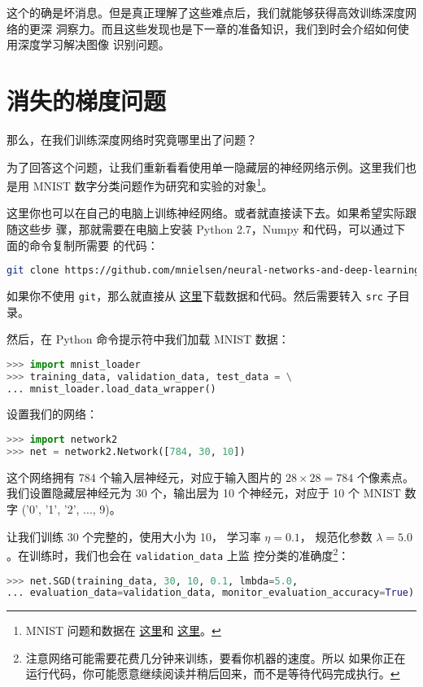 这个的确是坏消息。但是真正理解了这些难点后，我们就能够获得高效训练深度网络的更深
洞察力。而且这些发现也是下一章的准备知识，我们到时会介绍如何使用深度学习解决图像
识别问题。

\section{消失的梯度问题}
\label{sec:the_vanishing_gradient_problem}

那么，在我们训练深度网络时究竟哪里出了问题？
 
为了回答这个问题，让我们重新看看使用单一隐藏层的神经网络示例。这里我们也是用
MNIST 数字分类问题作为研究和实验的对象\footnote{ MNIST 问题和数据在%
  \hyperref[sec:learning_with_gradient_descent]{这里}和%
  \hyperref[sec:implementing_our_network_to_classify_digits]{这里}。}。
 
这里你也可以在自己的电脑上训练神经网络。或者就直接读下去。如果希望实际跟随这些步
骤，那就需要在电脑上安装 Python 2.7，Numpy 和代码，可以通过下面的命令复制所需要
的代码：
\begin{lstlisting}[language=sh]
git clone https://github.com/mnielsen/neural-networks-and-deep-learning.git  
\end{lstlisting}

如果你不使用 \lstinline!git!，那么就直接从%
\href{https://github.com/mnielsen/neural-networks-and-deep-learning/archive/master.zip}{
  这里}下载数据和代码。然后需要转入 \lstinline!src! 子目录。

然后，在 Python 命令提示符中我们加载 MNIST 数据：
\begin{lstlisting}[language=Python]
>>> import mnist_loader
>>> training_data, validation_data, test_data = \
... mnist_loader.load_data_wrapper()  
\end{lstlisting}

设置我们的网络：
\begin{lstlisting}[language=Python]
>>> import network2 
>>> net = network2.Network([784, 30, 10]) 
\end{lstlisting}

这个网络拥有 784 个输入层神经元，对应于输入图片的 $28 \times 28 = 784$ 个像素点。
我们设置隐藏层神经元为 30 个，输出层为 10 个神经元，对应于 10 个 MNIST 数字
('0', '1', '2', ..., 9)。

让我们训练 30 个完整的\epochs{}，使用\minibatch{}大小为 10， 学习率 $\eta = 0.1$，
规范化参数 $\lambda = 5.0$。在训练时，我们也会在 \lstinline!validation_data! 上监
控分类的准确度\footnote{注意网络可能需要花费几分钟来训练，要看你机器的速度。所以
  如果你正在运行代码，你可能愿意继续阅读并稍后回来，而不是等待代码完成执行。}：
\begin{lstlisting}[language=Python]
>>> net.SGD(training_data, 30, 10, 0.1, lmbda=5.0,  
... evaluation_data=validation_data, monitor_evaluation_accuracy=True) 
\end{lstlisting}

